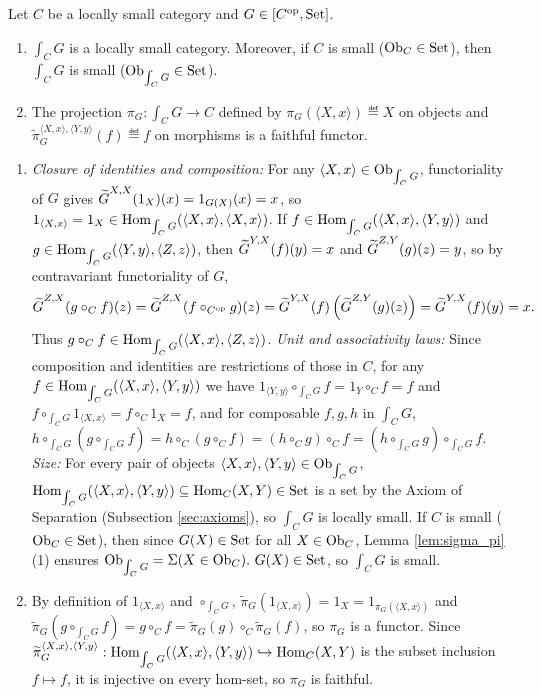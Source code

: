 \documentclass[10pt,a4paper]{article}
\begin{document}
\begin{lemma}\label{lem:cat_of_elements}
Let $C$ be a locally small category and $G \in [C^{\textrm{op}}, {\textrm{Set}}]$.
\begin{enumerate}
\item $\int_C G$ is a locally small category. Moreover, if $C$ is small (${\textrm{Ob}}_C \in {\textrm{Set}}$), then $\int_C G$ is small (${\textrm{Ob}}_{\int_C G} \in {\textrm{Set}}$).
\item The projection $\pi_G : \int_C G \to C$ defined by $\pi_G(\langle X, x \rangle) \eqdef X$ on objects and $\widetilde{\pi}_G^{\langle X,x\rangle,\langle Y,y\rangle}(f) \eqdef f$ on morphisms is a faithful functor.
\end{enumerate}
\end{lemma}
\myprf
\begin{enumerate}
\item \emph{Closure of identities and composition:} For any $\langle X, x \rangle \in {\textrm{Ob}}_{\int_C G}$, functoriality of $G$ gives ${\widetilde{G}\textrm{}}^{X,X}(1_X)(x) = 1_{G(X)}(x) = x$, so $1_{\langle X,x\rangle} = 1_X \in {\textrm{Hom}}_{\int_C G}(\langle X, x \rangle, \langle X, x \rangle)$. If $f \in {\textrm{Hom}}_{\int_C G}(\langle X, x \rangle, \langle Y, y \rangle)$ and $g \in {\textrm{Hom}}_{\int_C G}(\langle Y, y \rangle, \langle Z, z \rangle)$, then ${\widetilde{G}\textrm{}}^{Y,X}(f)(y) = x$ and ${\widetilde{G}\textrm{}}^{Z,Y}(g)(z) = y$, so by contravariant functoriality of $G$,
$${\widetilde{G}\textrm{}}^{Z,X}(g \circ_C f)(z) = {\widetilde{G}\textrm{}}^{Z,X}(f \circ_{C^{\textrm{op}}} g)(z) = {\widetilde{G}\textrm{}}^{Y,X}(f)\left({\widetilde{G}\textrm{}}^{Z,Y}(g)(z)\right) = {\widetilde{G}\textrm{}}^{Y,X}(f)(y) = x.$$
Thus $g \circ_C f \in {\textrm{Hom}}_{\int_C G}(\langle X, x \rangle, \langle Z, z \rangle)$.
\emph{Unit and associativity laws:} Since composition and identities are restrictions of those in $C$, for any $f \in {\textrm{Hom}}_{\int_C G}(\langle X,x\rangle, \langle Y,y\rangle)$ we have $1_{\langle Y,y\rangle} \circ_{\int_C G} f = 1_Y \circ_C f = f$ and $f \circ_{\int_C G} 1_{\langle X,x\rangle} = f \circ_C 1_X = f$, and for composable $f, g, h$ in $\int_C G$, $h \circ_{\int_C G} (g \circ_{\int_C G} f) = h \circ_C (g \circ_C f) = (h \circ_C g) \circ_C f = (h \circ_{\int_C G} g) \circ_{\int_C G} f$.
\emph{Size:} For every pair of objects $\langle X,x \rangle, \langle Y,y \rangle \in {\textrm{Ob}}_{\int_C G}$, ${\textrm{Hom}}_{\int_C G}(\langle X,x \rangle, \langle Y,y \rangle) \subseteq {\textrm{Hom}}_C(X,Y) \in {\textrm{Set}}$ is a set by the Axiom of Separation (Subsection \ref{sec:axioms}), so $\int_C G$ is locally small. If $C$ is small (${\textrm{Ob}}_C \in {\textrm{Set}}$), then since $G(X) \in {\textrm{Set}}$ for all $X \in {\textrm{Ob}}_C$, Lemma \ref{lem:sigma_pi}(1) ensures ${\textrm{Ob}}_{\int_C G} = \Sigma(X \in {\textrm{Ob}}_C).\ G(X) \in {\textrm{Set}}$, so $\int_C G$ is small.
\item By definition of $1_{\langle X,x\rangle}$ and $\circ_{\int_C G}$, $\widetilde{\pi}_G(1_{\langle X,x\rangle}) = 1_X = 1_{\pi_G(\langle X,x\rangle)}$ and $\widetilde{\pi}_G(g \circ_{\int_C G} f) = g \circ_C f = \widetilde{\pi}_G(g) \circ_C \widetilde{\pi}_G(f)$, so $\pi_G$ is a functor. Since $\widetilde{\pi}_G^{\langle X,x\rangle, \langle Y,y\rangle} : {\textrm{Hom}}_{\int_C G}(\langle X,x \rangle, \langle Y,y \rangle) \hookrightarrow {\textrm{Hom}}_C(X,Y)$ is the subset inclusion $f \mapsto f$, it is injective on every hom-set, so $\pi_G$ is faithful.
\end{enumerate}
\myqed
\end{document}
